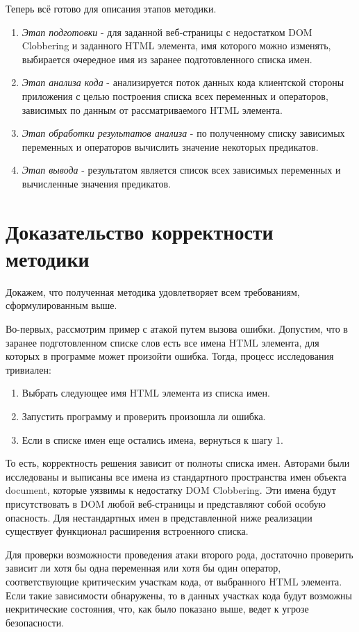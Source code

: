 Теперь всё готово для описания этапов методики.
\begin{enumerate}
	\item \textit{Этап подготовки} - для заданной веб-страницы с недостатком DOM Clobbering и заданного HTML элемента, имя которого можно изменять, выбирается очередное имя из заранее подготовленного списка имен.
	\item \textit{Этап анализа кода} - анализируется поток данных кода клиентской стороны приложения с целью построения списка всех переменных и операторов, зависимых по данным от рассматриваемого HTML элемента.
	\item \textit{Этап обработки результатов анализа} - по полученному списку зависимых переменных и операторов вычислить значение некоторых предикатов.
	\item \textit{Этап вывода} - результатом является список всех зависимых переменных и вычисленные значения предикатов.
\end{enumerate}
\bigskip

\section{Доказательство корректности методики}
Докажем, что полученная методика удовлетворяет всем требованиям, сформулированным выше.


Во-первых, рассмотрим пример с атакой путем вызова ошибки. Допустим, что в заранее подготовленном списке слов есть все имена HTML элемента, для которых в программе может произойти ошибка. Тогда, процесс исследования тривиален: 
\begin{enumerate}
	\item Выбрать следующее имя HTML элемента из списка имен.
	\item Запустить программу и проверить произошла ли ошибка.
	\item Если в списке имен еще остались имена, вернуться к шагу 1.
\end{enumerate}
То есть, корректность решения зависит от полноты списка имен. Авторами были исследованы и выписаны все имена из стандартного пространства имен объекта document, которые уязвимы к недостатку DOM Clobbering. Эти имена будут присутствовать в DOM любой веб-страницы и представляют собой особую опасность. Для нестандартных имен в представленной ниже реализации существует функционал расширения встроенного списка.

\bigskip
Для проверки возможности проведения атаки второго рода, достаточно проверить зависит ли хотя бы одна переменная или хотя бы один оператор, соответствующие критическим участкам кода, от выбранного HTML элемента. Если такие зависимости обнаружены, то в данных участках кода будут возможны некритические состояния, что, как было показано выше, ведет к угрозе безопасности.

